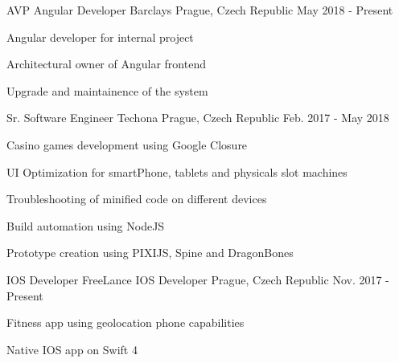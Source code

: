 

\begin{cventries}

    \cventry
    {AVP Angular Developer} %
    {Barclays} %
    {Prague, Czech Republic} %
    {May 2018 - Present} %
    {
    \begin{cvitems} %
        \item {Angular developer for internal project}
        \item {Architectural owner of Angular frontend}
        \item {Upgrade and maintainence of the system}
    \end{cvitems}
    }

    \cventry
    {Sr. Software Engineer} %
    {Techona} %
    {Prague, Czech Republic} %
    {Feb. 2017 - May 2018} %
    {
    \begin{cvitems} %
        \item {Casino games development using Google Closure}
        \item {UI Optimization for smartPhone, tablets and physicals slot machines}
        \item {Troubleshooting of minified code on different devices}
        \item {Build automation using NodeJS}
        \item {Prototype creation using PIXIJS, Spine and DragonBones}
    \end{cvitems}
    }

    \cventry
    {IOS Developer} %
    {FreeLance IOS Developer} %
    {Prague, Czech Republic} %
    {Nov. 2017 - Present} %
    {
    \begin{cvitems} %
        \item {Fitness app using geolocation phone capabilities}
        \item {Native IOS app on Swift 4}
    \end{cvitems}
    }


\end{cventries}

